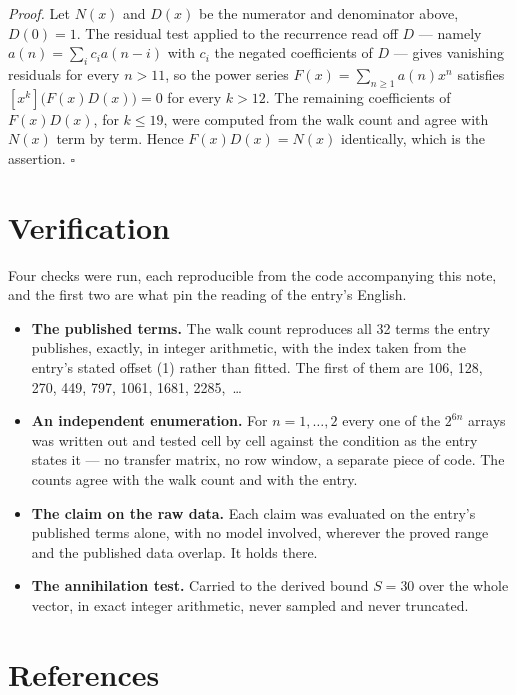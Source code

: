 \documentclass[11pt]{article}
\theoremstyle{definition}
\begin{document}
{\itshape Proof.} Let $N(x)$ and $D(x)$ be the numerator and denominator above, $D(0)=1$. The residual test applied to the recurrence read off $D$ --- namely $a(n) = \sum_i c_i a(n-i)$ with $c_i$ the negated coefficients of $D$ --- gives vanishing residuals for every $n > 11$, so the power series $F(x)=\sum_{n\ge 1}a(n)x^n$ satisfies $[x^k]\bigl(F(x)D(x)\bigr) = 0$ for every $k > 12$. The remaining coefficients of $F(x)D(x)$, for $k \le 19$, were computed from the walk count and agree with $N(x)$ term by term. Hence $F(x)D(x) = N(x)$ identically, which is the assertion. $\square$

\section{Verification}

Four checks were run, each reproducible from the code accompanying this note, and the first two are what pin the reading of the entry's English.

\begin{itemize}

\item {\bfseries The published terms.} The walk count reproduces all 32 terms the entry publishes, exactly, in integer arithmetic, with the index taken from the entry's stated offset (1) rather than fitted. The first of them are 106, 128, 270, 449, 797, 1061, 1681, 2285,~\dots

\item {\bfseries An independent enumeration.} For $n = 1,\dots,2$ every one of the $2^{6n}$ arrays was written out and tested cell by cell against the condition as the entry states it --- no transfer matrix, no row window, a separate piece of code. The counts agree with the walk count and with the entry.

\item {\bfseries The claim on the raw data.} Each claim was evaluated on the entry's published terms alone, with no model involved, wherever the proved range and the published data overlap. It holds there.

\item {\bfseries The annihilation test.} Carried to the derived bound $S = 30$ over the whole vector, in exact integer arithmetic, never sampled and never truncated.

\end{itemize}

\section{References}
\end{document}
